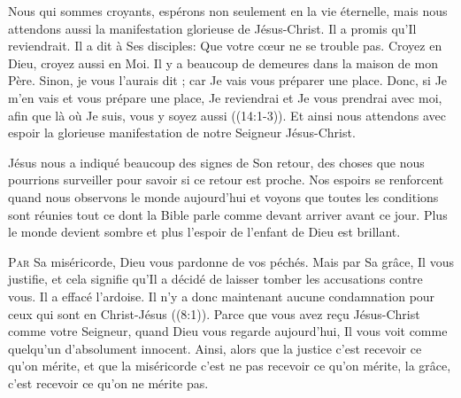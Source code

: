 
Nous qui sommes croyants, espérons non seulement en la vie éternelle,
 mais nous attendons aussi la manifestation glorieuse de Jésus-Christ.
 Il a promis qu'Il reviendrait. Il a dit à Ses disciples: 
 \Og Que votre c\oe{}ur ne se trouble pas. Croyez en Dieu, croyez aussi en Moi.
 Il y a beaucoup de demeures dans la maison de mon Père.
 Sinon, je vous l'aurais dit ; car Je vais vous préparer une place.
 Donc, si Je m'en vais et vous prépare une place, Je reviendrai
 et Je vous prendrai avec moi, afin que là où Je suis,
 vous y soyez aussi \Fg{} ((14:1-3)).
 Et ainsi nous attendons avec espoir la glorieuse manifestation
 de notre Seigneur Jésus-Christ. 

Jésus nous a indiqué beaucoup des signes de Son retour,
 des choses que nous pourrions surveiller pour savoir si ce retour est proche.
 Nos espoirs se renforcent quand nous observons le monde aujourd'hui
 et voyons que toutes les conditions sont réunies \ocadr tout ce dont la Bible
 parle comme devant arriver avant ce jour.
 Plus le monde devient sombre et plus l'espoir de l'enfant de Dieu
 est brillant. 

\dvrule






\lettrine{P}{ar} Sa miséricorde, Dieu vous pardonne de vos péchés.
 Mais par Sa grâce, Il vous justifie, et cela signifie qu'Il a décidé
 de laisser tomber les accusations contre vous. Il a effacé l'ardoise.
 \Og Il n'y a donc maintenant aucune condamnation pour ceux
 qui sont en Christ-Jésus \Fg{} ((8:1)).
 Parce que vous avez re\c{c}u Jésus-Christ comme votre Seigneur,
 quand Dieu vous regarde aujourd'hui, Il vous voit comme quelqu'un
 d'absolument innocent. Ainsi, alors que la justice c'est recevoir
 ce qu'on mérite, et que la miséricorde c'est ne pas recevoir
 ce qu'on mérite, la grâce, c'est recevoir ce qu'on ne mérite pas. 

